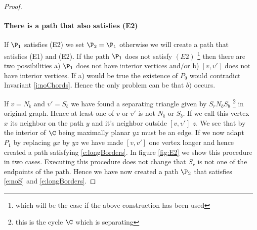 \begin{proof}
\paragraph{There is a path that also satisfies (E2)}
If $\P_1$ satisfies (E2) we set $\P_2 = \P_1$ otherwise we will create a path that satisfies (E1) and (E2).
If the path $\P_1$ does not satisfy $(E2)$ \footnote{which will be the case if the above construction has been used} then there are two possibilities  a) $\P_1$ does not have interior vertices and/or b) $[v,v']$ does not have interior vertices. If a) would be true the existence of $P_0$ would contradict Invariant \ref{i:noChords}. Hence the only problem can be that $b)$ occurs.

If $v=N_b$ and $v'=S_b$ we have found a separating triangle given by $S_rN_bS_b$ \footnote{this is the cycle $\C$ which is separating} in original graph. Hence at least one of $v$ or $v'$ is not $N_b$ or $S_b$. If we call this vertex $x$ its neighbor on the path $y$ and it's neighbor outside $[v,v']$ $z$. We see that by the interior of $\C$ being maximally planar $yz$ must be an edge. If we now adapt $P_1$ by replacing $yx$ by $yz$ we have made $[v,v']$ one vertex longer and hence created a path satisfying \ref{e:longBorders}. In figure \ref{fig:E2} we show this procedure in two cases. Executing this procedure does not change that $S_r$ is not one of the endpoints of the path. Hence we have now created a path $\P_2$ that satisfies \ref{e:noS} and \ref{e:longBorders}.


\end{proof}
